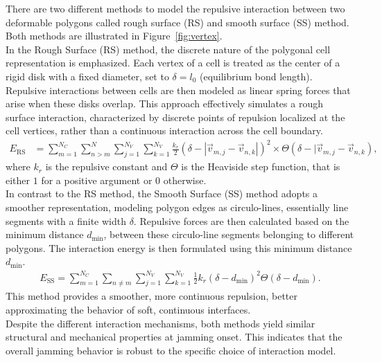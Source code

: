 There are two different methods to model the repulsive interaction between two deformable polygons called rough surface (RS) and smooth surface (SS) method.
Both methods are illustrated in Figure~\ref{fig:vertex}. \\ 
In the Rough Surface (RS) method, the discrete nature of the polygonal cell representation is emphasized. 
Each vertex of a cell is treated as the center of a rigid disk with a fixed diameter, set to $\delta = l_0$ (equilibrium bond length).
Repulsive interactions between cells are then modeled as linear spring forces that arise when these disks overlap. 
This approach effectively simulates a rough surface interaction, characterized by discrete points of repulsion localized at the cell vertices, rather than a continuous interaction across the cell boundary.
\begin{align*}
	E_{\text{RS}} &=  \sum\limits_{m=1}^{N_C} \sum\limits_{n>m}^{N} \sum\limits_{j=1}^{N_V} \sum\limits_{k=1}^{N_V} \frac{k_r}{2} (\delta - |\vec{v}_{m,j} - \vec{v}_{n,k} |)^2 \times \Theta(\delta - |\vec{v}_{m,j} - \vec{v}_{n,k}) ,
\end{align*}
where $k_r$ is the repulsive constant and $\Theta$ is the Heaviside step function, that is either $1$ for a positive argument or $0$ otherwise. \\
In contrast to the RS method, the Smooth Surface (SS) method adopts a smoother representation, modeling polygon edges as circulo-lines, essentially line segments with a finite width $\delta$. 
Repulsive forces are then calculated based on the minimum distance $d_{\text{min}}$, between these circulo-line segments belonging to different polygons. 
The interaction energy is then formulated using this minimum distance $d_{\text{min}}$.
\begin{align*}
	E_{\text{SS}} = \sum_{m=1}^{N_C} \sum_{n \neq m} \sum_{j=1}^{N_V} \sum_{k=1}^{N_V} \frac{1}{2} k_r \left( \delta - d_{\min} \right)^2 \Theta\left( \delta - d_{\min} \right).
\end{align*}
This method provides a smoother, more continuous repulsion, better approximating the behavior of soft, continuous interfaces. \\ 
Despite the different interaction mechanisms, both methods yield similar structural and mechanical properties at jamming onset. 
This indicates that the overall jamming behavior is robust to the specific choice of interaction model. \\

